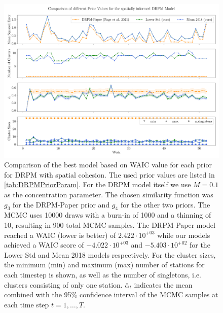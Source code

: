 \documentclass[12pt,a4paper]{article}
\begin{document}
\begin{figure}
    \centering
    \includegraphics[width=.95\linewidth]{./imgs/drpm/drpm_spatial_informed_comparison.pdf}
    \caption{Comparison of the best model based on WAIC value for each prior for DRPM with spatial cohesion.
    The used prior values are listed in \cref{tab:DRPMPriorParam}. For the DRPM model itself we use
    $M=0.1$ as the concentration parameter. The chosen similarity function was $g_3$ for the DRPM-Paper prior and $g_4$ for the other two priors. The MCMC uses 10000 draws with a burn-in of 1000 and a
    thinning of 10, resulting in 900 total MCMC samples. The DRPM-Paper model reached a WAIC (lower is better) of
    $2.422 \cdot 10^{+03}$ while our models achieved a WAIC score of $-4.022 \cdot 10^{+03}$ and
    $-5.403 \cdot 10^{+02}$ for the Lower Std and Mean 2018 models respectively. For the cluster sizes,
    the minimum (min) and maximum (max) number of stations for each timestep is shown, as well as the number of
    singletons, i.e. clusters consisting of only one station. $\bar{\alpha}_t$ 
    indicates the mean combined with the 95\% confidence interval
    of the MCMC samples at each time step $t=1, \ldots, T$.}
    \label{fig:drpm_spatial_informed_comparison}
\end{figure}
\end{document}

